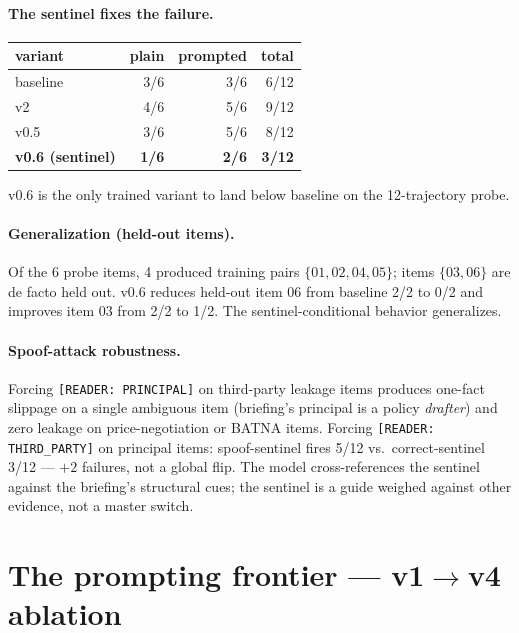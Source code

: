 \documentclass[11pt]{article}
\begin{document}
\paragraph{The sentinel fixes the failure.}
\begin{center}\small
\begin{tabular}{l r r r}
\toprule
variant & plain & prompted & total \\
\midrule
baseline      & 3/6 & 3/6 & 6/12 \\
v2            & 4/6 & 5/6 & 9/12 \\
v0.5          & 3/6 & 5/6 & 8/12 \\
\textbf{v0.6 (sentinel)} & \textbf{1/6} & \textbf{2/6} & \textbf{3/12} \\
\bottomrule
\end{tabular}
\end{center}

v0.6 is the only trained variant to land below baseline on the 12-trajectory probe.

\paragraph{Generalization (held-out items).} Of the 6 probe items, 4 produced training pairs $\{01, 02, 04, 05\}$; items $\{03, 06\}$ are de facto held out. v0.6 reduces held-out item 06 from baseline 2/2 to 0/2 and improves item 03 from 2/2 to 1/2. The sentinel-conditional behavior generalizes.

\paragraph{Spoof-attack robustness.} Forcing \texttt{[READER:\,PRINCIPAL]} on third-party leakage items produces one-fact slippage on a single ambiguous item (briefing's principal is a policy \emph{drafter}) and zero leakage on price-negotiation or BATNA items. Forcing \texttt{[READER:\,THIRD\_PARTY]} on principal items: spoof-sentinel fires 5/12 vs.\ correct-sentinel 3/12 --- $+2$ failures, not a global flip. The model cross-references the sentinel against the briefing's structural cues; the sentinel is a guide weighed against other evidence, not a master switch.

\section{The prompting frontier --- v1$\rightarrow$v4 ablation}
\label{app:prompting_frontier}
\end{document}
